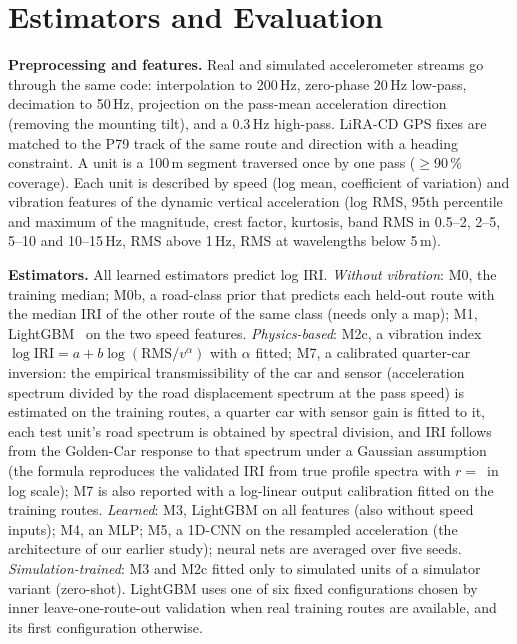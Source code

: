 \section{Estimators and Evaluation}
\label{sec:method}

\textbf{Preprocessing and features.}
Real and simulated accelerometer streams go through the same code: interpolation to 200\,Hz, zero-phase 20\,Hz low-pass, decimation to 50\,Hz, projection on the pass-mean acceleration direction (removing the mounting tilt), and a 0.3\,Hz high-pass.
LiRA-CD GPS fixes are matched to the P79 track of the same route and direction with a heading constraint.
A unit is a 100\,m segment traversed once by one pass ($\ge$90\,\% coverage).
Each unit is described by speed (log mean, coefficient of variation) and vibration features of the dynamic vertical acceleration (log RMS, 95th percentile and maximum of the magnitude, crest factor, kurtosis, band RMS in 0.5--2, 2--5, 5--10 and 10--15\,Hz, RMS above 1\,Hz, RMS at wavelengths below 5\,m).

\textbf{Estimators.}
All learned estimators predict log IRI.
\emph{Without vibration}: M0, the training median; M0b, a road-class prior that predicts each held-out route with the median IRI of the other route of the same class (needs only a map); M1, LightGBM~\cite{ke2017lightgbm} on the two speed features.
\emph{Physics-based}: M2c, a vibration index $\log \mathrm{IRI} = a + b \log(\mathrm{RMS}/v^{\alpha})$ with $\alpha$ fitted; M7, a calibrated quarter-car inversion: the empirical transmissibility of the car and sensor (acceleration spectrum divided by the road displacement spectrum at the pass speed) is estimated on the training routes, a quarter car with sensor gain is fitted to it, each test unit's road spectrum is obtained by spectral division, and IRI follows from the Golden-Car response to that spectrum under a Gaussian assumption (the formula reproduces the validated IRI from true profile spectra with $r=$\,\invCheckR{} in log scale); M7 is also reported with a log-linear output calibration fitted on the training routes.
\emph{Learned}: M3, LightGBM on all features (also without speed inputs); M4, an MLP; M5, a 1D-CNN on the resampled acceleration (the architecture of our earlier study); neural nets are averaged over five seeds.
\emph{Simulation-trained}: M3 and M2c fitted only to simulated units of a simulator variant (zero-shot). LightGBM uses one of six fixed configurations chosen by inner leave-one-route-out validation when real training routes are available, and its first configuration otherwise.

